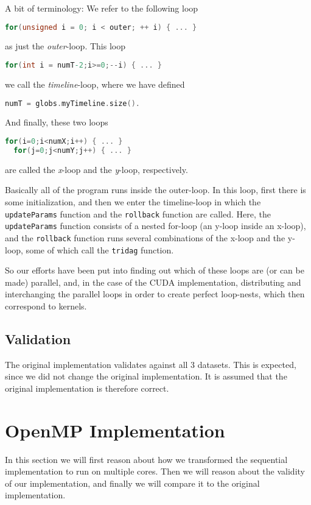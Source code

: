 \documentclass[11pt]{article}
\begin{document}
A bit of terminology: We refer to the following loop
\begin{lstlisting}[language=C]
  for(unsigned i = 0; i < outer; ++ i) { ... }
\end{lstlisting}
as just the \emph{outer}-loop. This loop
\begin{lstlisting}[language=C]
  for(int i = numT-2;i>=0;--i) { ... }
\end{lstlisting}
we call the \emph{timeline}-loop, where we have defined
\begin{lstlisting}[language=C]
  numT = globs.myTimeline.size().
\end{lstlisting}
And finally, these two loops
\begin{lstlisting}[language=C]
  for(i=0;i<numX;i++) { ... }
  for(j=0;j<numY;j++) { ... }
\end{lstlisting}
are called the \emph{x}-loop and the \emph{y}-loop, respectively.

Basically all of the program runs inside the outer-loop.
In this loop, first there is some initialization, and then we enter the timeline-loop in which the \texttt{updateParams} function and the \texttt{rollback} function are called.
Here, the \texttt{updateParams} function consists of a nested for-loop (an y-loop inside an x-loop), and the \texttt{rollback} function runs several combinations of the x-loop and the y-loop, some of which call the \texttt{tridag} function.

So our efforts have been put into finding out which of these loops are (or can be made) parallel, and, in the case of the CUDA implementation, distributing and interchanging the parallel loops in order to create perfect loop-nests, which then correspond to kernels.


\subsection{Validation}
The original implementation validates against all 3 datasets. This is expected,
since we did not change the original implementation. It is assumed that the 
original implementation is therefore correct.


\section{OpenMP Implementation}
In this section we will first reason about how we transformed the sequential
implementation to run on multiple cores. Then we will reason about the validity 
of our implementation, and finally we will compare it to the original 
implementation.
\end{document}
